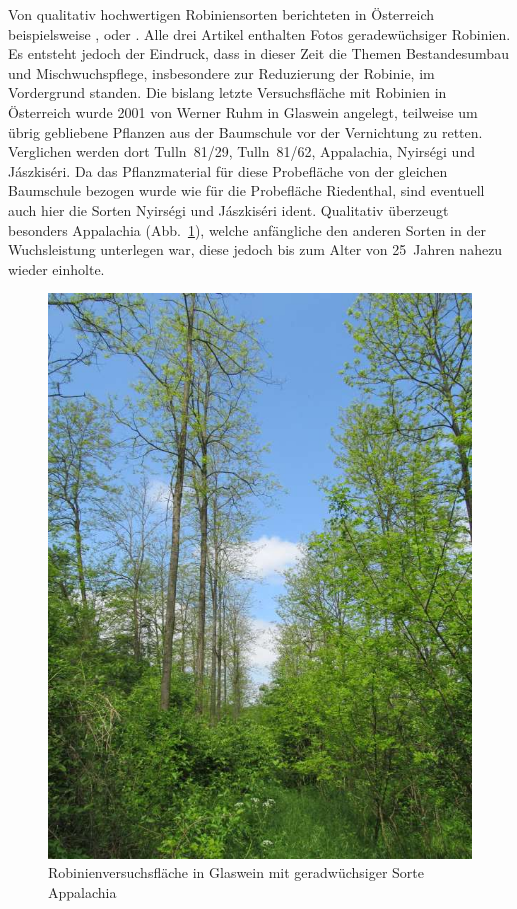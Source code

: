 \documentclass[twocolumn]{scrartcl}
\begin{document}
Von qualitativ hochwertigen Robiniensorten berichteten in Österreich
beispielsweise \cite{mueller1991robinie}, \cite{iby1998robinie} oder
\cite{demel2004robinie}. Alle drei Artikel enthalten Fotos
geradewüchsiger Robinien. Es entsteht jedoch der Eindruck, dass in dieser
Zeit die Themen Bestandesumbau und Mischwuchspflege, insbesondere
zur Reduzierung der Robinie, im Vordergrund standen.
Die bislang letzte Versuchsfläche mit Robinien in Österreich wurde 2001
von Werner Ruhm in Glaswein angelegt, teilweise um übrig gebliebene
Pflanzen aus der Baumschule vor der Vernichtung zu retten.
Verglichen werden dort Tulln~81/29,
Tulln~81/62, Appalachia, Nyirségi und Jászkiséri. Da das
Pflanzmaterial für diese Probefläche von der gleichen Baumschule
bezogen wurde wie für die Probefläche Riedenthal, sind eventuell auch
hier die Sorten Nyirségi und Jászkiséri ident. Qualitativ überzeugt
besonders Appalachia (Abb.~\ref{fig:glaswein2}), welche anfängliche
den anderen Sorten in der Wuchsleistung unterlegen war, diese jedoch
bis zum Alter von 25~Jahren nahezu wieder einholte.

\begin{figure}[htbp]
  \centering
  \includegraphics[width=.9\linewidth]{./bild/GlasweinRobinie2023b}
  \caption{Robinienversuchsfläche in Glaswein mit geradwüchsiger Sorte Appalachia}
  \label{fig:glaswein2}
\end{figure}
\end{document}
